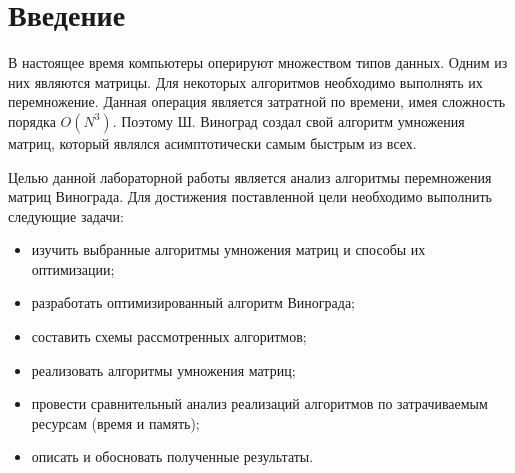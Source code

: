 \chapter*{Введение}

В настоящее время компьютеры оперируют множеством типов данных. Одним из них являются матрицы. Для некоторых алгоритмов необходимо выполнять их перемножение. Данная операция является затратной по времени, имея сложность порядка $O(N^3)$. Поэтому Ш. Виноград создал свой алгоритм умножения матриц, который являлся асимптотически самым быстрым из всех.

Целью данной лабораторной работы является анализ алгоритмы перемножения матриц Винограда. Для достижения поставленной цели необходимо выполнить следующие задачи:
\begin{itemize}
	\item изучить выбранные алгоритмы умножения матриц и способы их оптимизации;
	\item разработать оптимизированный алгоритм Винограда;
	\item составить схемы рассмотренных алгоритмов;
	\item реализовать алгоритмы умножения матриц;
	\item провести сравнительный анализ реализаций алгоритмов по затрачиваемым ресурсам (время и память);
	\item описать и обосновать полученные результаты.
\end{itemize}